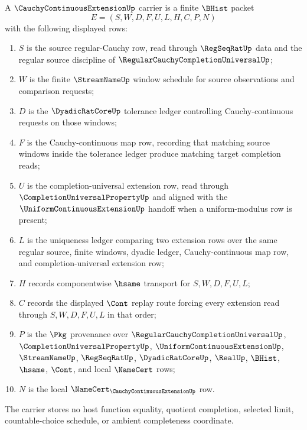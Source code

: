 \begin{definition}
\label{def:cauchy-continuous-extension-carrier}
A $\CauchyContinuousExtensionUp$ carrier is a finite $\BHist$ packet
$$
E=(S,W,D,F,U,L,H,C,P,N)
$$
with the following displayed rows:
\begin{enumerate}
\item $S$ is the source regular-Cauchy row, read through $\RegSeqRatUp$ data and the regular source discipline of $\RegularCauchyCompletionUniversalUp$;
\item $W$ is the finite $\StreamNameUp$ window schedule for source observations and comparison requests;
\item $D$ is the $\DyadicRatCoreUp$ tolerance ledger controlling Cauchy-continuous requests on those windows;
\item $F$ is the Cauchy-continuous map row, recording that matching source windows inside the tolerance ledger produce matching target completion reads;
\item $U$ is the completion-universal extension row, read through $\CompletionUniversalPropertyUp$ and aligned with the $\UniformContinuousExtensionUp$ handoff when a uniform-modulus row is present;
\item $L$ is the uniqueness ledger comparing two extension rows over the same regular source, finite windows, dyadic ledger, Cauchy-continuous map row, and completion-universal extension row;
\item $H$ records componentwise $\hsame$ transport for $S,W,D,F,U,L$;
\item $C$ records the displayed $\Cont$ replay route forcing every extension read through $S,W,D,F,U,L$ in that order;
\item $P$ is the $\Pkg$ provenance over $\RegularCauchyCompletionUniversalUp$, $\CompletionUniversalPropertyUp$, $\UniformContinuousExtensionUp$, $\StreamNameUp$, $\RegSeqRatUp$, $\DyadicRatCoreUp$, $\RealUp$, $\BHist$, $\hsame$, $\Cont$, and local $\NameCert$ rows;
\item $N$ is the local $\NameCert_{\CauchyContinuousExtensionUp}$ row.
\end{enumerate}
The carrier stores no host function equality, quotient completion, selected limit, countable-choice schedule, or ambient completeness coordinate.
\end{definition}

